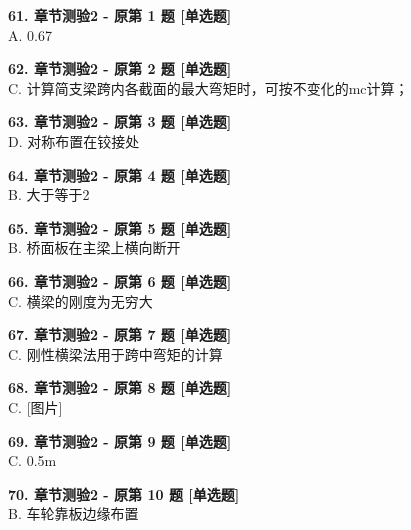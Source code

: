 \documentclass[UTF8,zihao=-4,openany]{ctexbook}
\begin{document}
\begin{answerline}
\textbf{61. 章节测验2 - 原第 1 题 [单选题]}\\
A. 0.67
\end{answerline}

\begin{answerline}
\textbf{62. 章节测验2 - 原第 2 题 [单选题]}\\
C. 计算简支梁跨内各截面的最大弯矩时，可按不变化的mc计算；
\end{answerline}

\begin{answerline}
\textbf{63. 章节测验2 - 原第 3 题 [单选题]}\\
D. 对称布置在铰接处
\end{answerline}

\begin{answerline}
\textbf{64. 章节测验2 - 原第 4 题 [单选题]}\\
B. 大于等于2
\end{answerline}

\begin{answerline}
\textbf{65. 章节测验2 - 原第 5 题 [单选题]}\\
B. 桥面板在主梁上横向断开
\end{answerline}

\begin{answerline}
\textbf{66. 章节测验2 - 原第 6 题 [单选题]}\\
C. 横梁的刚度为无穷大
\end{answerline}

\begin{answerline}
\textbf{67. 章节测验2 - 原第 7 题 [单选题]}\\
C. 刚性横梁法用于跨中弯矩的计算
\end{answerline}

\begin{answerline}
\textbf{68. 章节测验2 - 原第 8 题 [单选题]}\\
C. [图片]
\end{answerline}

\begin{answerline}
\textbf{69. 章节测验2 - 原第 9 题 [单选题]}\\
C. 0.5m
\end{answerline}

\begin{answerline}
\textbf{70. 章节测验2 - 原第 10 题 [单选题]}\\
B. 车轮靠板边缘布置
\end{answerline}
\end{document}
